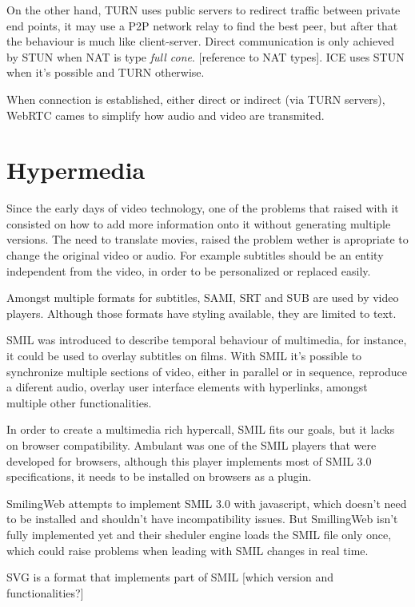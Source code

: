 \documentclass[11pt,twocolumn]{article}
\begin{document}
On the other hand, TURN uses public servers to redirect traffic between private end points, it may use a P2P network relay to find the best peer, but after that the behaviour is much like client-server. Direct communication is only achieved by STUN when NAT is type \textit{full cone}. {\color{red} [reference to NAT types]}. ICE uses STUN when it's possible and TURN otherwise.

When connection is established, either direct or indirect (via TURN servers), WebRTC cames to simplify how audio and video are transmited. 

\section{Hypermedia}

  Since the early days of video technology, one of the problems that raised with it consisted on how to add more information onto it without generating multiple versions. The need to translate movies, raised the problem wether is apropriate to change the original video or audio. For example subtitles should be an entity independent from the video, in order to be personalized or replaced easily.
 
  Amongst multiple formats for subtitles, SAMI, SRT and SUB are used by video players. Although those formats have styling available, they are limited to text. 

  SMIL was introduced to describe temporal behaviour of multimedia, for instance, it could be used to overlay subtitles on films. With SMIL it's possible to synchronize multiple sections of video, either in parallel or in sequence, reproduce a diferent audio, overlay user interface elements with hyperlinks, amongst multiple other functionalities.

  In order to create a multimedia rich hypercall, SMIL fits our goals, but it lacks on browser compatibility. Ambulant was one of the SMIL players that were developed for browsers, although this player implements most of SMIL 3.0 specifications, it needs to be installed on browsers as a plugin.

  SmilingWeb attempts to implement SMIL 3.0 with javascript, which doesn't need to be installed and shouldn't have incompatibility issues. But SmillingWeb isn't fully implemented yet and their sheduler engine loads the SMIL file only once, which could raise problems when leading with SMIL changes in real time.  

  SVG is a format that implements part of SMIL {\color{red} [which version and functionalities?]}
\end{document}
